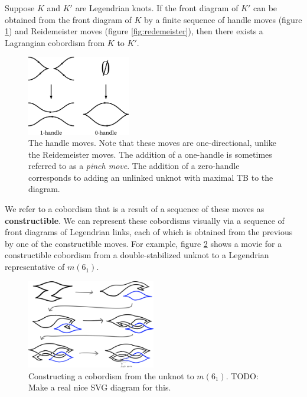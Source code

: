 \begin{theorem}
    Suppose $K$ and $K'$ are Legendrian knots. If the front diagram of $K'$ can be obtained from the front diagram of $K$ by a finite sequence of handle moves (figure \ref{fig:handles}) and Reidemeister moves (figure \ref{fig:redemeister}), then there exists a Lagrangian cobordism from $K$ to $K'$. 
\end{theorem}
\begin{figure}[ht!]
    \centering
    \includegraphics[width=0.4\textwidth]{images/handles.pdf}
    \caption{The handle moves. Note that these moves are one-directional, unlike the Reidemeister moves. The addition of a one-handle is sometimes referred to as a \emph{pinch move}. The addition of a zero-handle corresponds to adding an unlinked unknot with maximal TB to the diagram.}
    \label{fig:handles}
\end{figure}

We refer to a cobordism that is a result of a sequence of these moves as \textbf{constructible}. We can represent these cobordisms visually via a sequence of front diagrams of Legendrian links, each of which is obtained from the previous by one of the constructible moves. For example, figure \ref{fig:cobordism-construction} shows a movie for a constructible cobordism from a double-stabilized unknot to a Legendrian representative of $m(6_1)$.

\begin{figure}[ht!]
    \centering
    \includegraphics[width=0.5\textwidth]{images/cobordism-construction.png}
    \caption{Constructing a cobordism from the unknot to $m(6_1)$.
    TODO: Make a real nice SVG diagram for this.}%
    \label{fig:cobordism-construction}
\end{figure}

